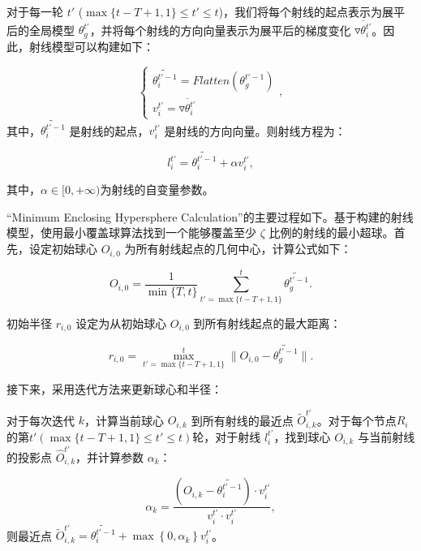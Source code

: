 \documentclass[lettersize,journal]{IEEEtran}
\begin{document}
\begin{enumerate}
对于每一轮 \( t' \) (\( \max\{t-T+1, 1\}\leq  t'\leq t \))，我们将每个射线的起点表示为展平后的全局模型 \( \theta_g^{t'} \)，并将每个射线的方向向量表示为展平后的梯度变化 \( \overline{\triangledown\theta_{i}^{t'}} \)。因此，射线模型可以构建如下：

\begin{equation}
    \left\{\begin{matrix}
    \widetilde{\theta_{i}^{t'-1}} = Flatten(\theta_g^{t'-1})\\
    {v}_{i}^{t'} = \overline{\triangledown\theta_{i}^{t'}}
    \end{matrix}\right.,
\end{equation}
其中，\( \widetilde{\theta_{i}^{t'-1}} \) 是射线的起点，\( {v}_{i}^{t'} \) 是射线的方向向量。则射线方程为：

\begin{equation}
l_i^{t'}=\widetilde{\theta_{i}^{t'-1}}+\alpha {v}_{i}^{t'},
\end{equation}

其中，$\alpha\in [0, +\infty)$为射线的自变量参数。

“Minimum Enclosing Hypersphere Calculation”的主要过程如下。基于构建的射线模型，使用最小覆盖球算法找到一个能够覆盖至少 \( \zeta \) 比例的射线的最小超球。首先，设定初始球心 \( O_{i,0} \) 为所有射线起点的几何中心，计算公式如下：

\begin{equation}
    O_{i,0} = \frac{1}{\min\{T, t\}} \sum_{t'=\max\{t-T+1, 1\}}^{t} \widetilde{\theta_g^{t'-1}}.
\end{equation}

初始半径 \( r_{i,0} \) 设定为从初始球心 \( O_{i,0} \) 到所有射线起点的最大距离：

\begin{equation}
r_{i,0} = \max_{t'=\max\{t-T+1, 1\}}^{t}  \|O_{i,0} - \widetilde{\theta_{g}^{t'-1}}\|.
\end{equation}

接下来，采用迭代方法来更新球心和半径：

对于每次迭代 \( k \)，计算当前球心 \( O_{i,k} \) 到所有射线的最近点 \( \tilde{O}_{i,k}^{t'} \)。对于每个节点$R_i$的第$t'(\max\{t-T+1, 1\}\leq  t'\leq t)$轮，对于射线 \( l_i^{t'} \)，找到球心 \( O_{i,k} \) 与当前射线的投影点 \( \hat O_{i,k}^{t'} \)，并计算参数 \( \alpha_k \)：


    \begin{equation}
    \alpha_k = \frac{(O_{i,k} - \widetilde{\theta_{i}^{t'-1}}) \cdot {v}_{i}^{t'}}{{v}_{i}^{t'}\cdot {v}_{i}^{t'}},
    \end{equation}
    则最近点 \( \tilde O_{i,k}^{t'} =\widetilde{\theta_{i}^{t'-1}}+\max \left\{ 0, \alpha_k\right\} {v}_{i}^{t'} \)。
    

\end{enumerate}
\end{document}
